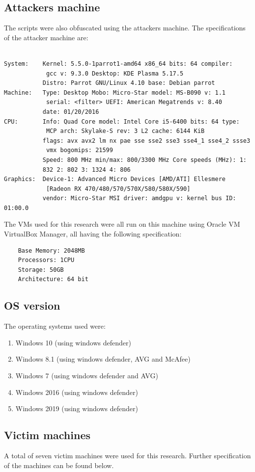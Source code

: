 \documentclass{article}%
\begin{document}
\subsection{Attackers machine}
The scripts were also obfuscated using the attackers machine. The specifications of the attacker machine are:\\
\\
\begin{verbatim}
System:    Kernel: 5.5.0-1parrot1-amd64 x86_64 bits: 64 compiler:
			gcc v: 9.3.0 Desktop: KDE Plasma 5.17.5 
           Distro: Parrot GNU/Linux 4.10 base: Debian parrot
Machine:   Type: Desktop Mobo: Micro-Star model: MS-B090 v: 1.1 
			serial: <filter> UEFI: American Megatrends v: 8.40 
           date: 01/20/2016 
CPU:       Info: Quad Core model: Intel Core i5-6400 bits: 64 type:
			MCP arch: Skylake-S rev: 3 L2 cache: 6144 KiB 
           flags: avx avx2 lm nx pae sse sse2 sse3 sse4_1 sse4_2 ssse3
            vmx bogomips: 21599 
           Speed: 800 MHz min/max: 800/3300 MHz Core speeds (MHz): 1: 
           832 2: 802 3: 1324 4: 806 
Graphics:  Device-1: Advanced Micro Devices [AMD/ATI] Ellesmere 
			[Radeon RX 470/480/570/570X/580/580X/590] 
           vendor: Micro-Star MSI driver: amdgpu v: kernel bus ID: 01:00.0
\end{verbatim}
The VMs used for this research were all run on this machine using Oracle VM VirtualBox Manager, all having the following specification:
\begin{verbatim}
	Base Memory: 2048MB
	Processors: 1CPU
	Storage: 50GB
	Architecture: 64 bit
\end{verbatim}
\subsection{OS version}
The operating systems used were:
\begin{enumerate}
	\item Windows 10 (using windows defender)
	\item Windows 8.1 (using windows defender, AVG and McAfee)
	\item Windows 7 (using windows defender and AVG)
	\item Windows 2016 (using windows defender)
	\item Windows 2019 (using windows defender)
\end{enumerate}
\subsection{Victim machines}
A total of seven victim machines were used for this research. Further specification of the machines can be found below.
\end{document}
